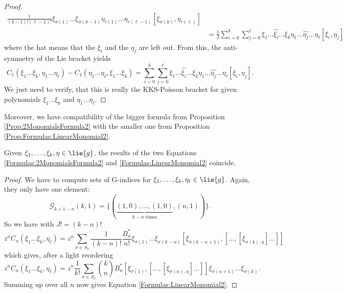 \begin{proof}
\begin{align*}
		\frac{1}{(k-1)! (\ell-1)!}
		\xi_{\sigma(1)} \ldots \xi_{\sigma(k-1)}
		\eta_{\tau(1)} \ldots \eta_{\tau(\ell-1)}
		[\xi_{\sigma(k)}, \eta_{\tau(\ell)}]
		\\
		& =
		\frac{1}{2}
		\sum\limits_{i = 0}^k
		\sum\limits_{j = 0}^{\ell}
		\xi_1 \ldots \widehat{\xi_i} \ldots \xi_k
		\eta_1 \ldots \widehat{\eta_j} \ldots \eta_{\ell}
		[\xi_i, \eta_j]
	\end{align*}
	where the hat means that the $\xi_i$ and the $\eta_j$ are left out. From 
	this, the anti-symmetry of the Lie bracket yields
	\begin{equation*}
		C_1 
		\left(
			\xi_1 \ldots \xi_k, \eta_1 \ldots \eta_{\ell}
		\right)
		-
		C_1 
		\left(
			\eta_1 \ldots \eta_{\ell}, \xi_1 \ldots \xi_k
		\right)
		=
		\sum\limits_{i = 0}^k
		\sum\limits_{j = 0}^{\ell}
		\xi_1 \ldots \widehat{\xi_i} \ldots \xi_k
		\eta_1 \ldots \widehat{\eta_j} \ldots \eta_{\ell}
		[\xi_i, \eta_j].
	\end{equation*}
	We just need to verify, that this is really the KKS-Poisson bracket for 
	given polynomials $\xi_1 \ldots \xi_k$ and $\eta_1 \ldots \eta_{\ell}$.
\end{proof}
Moreover, we have compatibility of the bigger formula from Proposition 
\ref{Prop:2MonomialsFormula2} with the smaller one from Proposition 
\ref{Prop:Formulas:LinearMonomial2}.
\begin{corollary}
	\label{Cor:Formulas:FormulasCoincide}
	Given $\xi_1, \ldots, \xi_k, \eta \in \lie{g}$, the results of the two 
	Equations \eqref{Formulas:2MonomialsFormula2} and 
	\eqref{Formulas:LinearMonomial2} coincide.
\end{corollary}
\begin{proof}
	We have to compute sets of G-indices for $\xi_1, \ldots, \xi_k, 
	\eta_{\ell} \in \lie{g}$. Again, they only have one element:
	\begin{equation*}
		\mathcal{G}_{k + 1 - n}(k, 1)
		=
		\Big\{
			( 
				\underbrace{(1,0), \ldots, (1,0)}_{
				k - n \text{ times}
				}
				,
				(n,1)
			)
		\Big\}.
	\end{equation*}
	So we have with $J! = (k - n)!$
	\begin{equation*}
		z^n C_n
		\left(
			\xi_1 \ldots \xi_k, \eta_{\ell}
		\right)
		=
		z^n
		\sum\limits_{\sigma \in S_k}
		\frac{1}{(k - n)!}
		\frac{B_n^*}{n!}
		\xi_{\sigma(1)} \ldots \xi_{\sigma(k-n)}
		[\xi_{\sigma(k-n+1)}, [
			\ldots, [\xi_{\sigma(k), \eta} ] \ldots 
		]]
	\end{equation*}
	which gives, after a light reordering
	\begin{equation*}
		z^n C_n
		\left(
			\xi_1 \ldots \xi_k, \eta_{\ell}
		\right)
		=
		z^n
		\frac{1}{k!}
		\sum\limits_{\sigma \in S_k}
		\binom{k}{n} B_n^*
		[\xi_{\sigma(1)}, [
			\ldots, [\xi_{\sigma(n), \eta} ] \ldots 
		]]
		\xi_{\sigma(n+1)} \ldots \xi_{\sigma(k)}.
	\end{equation*}
	Summing up over all $n$ now gives Equation 
	\eqref{Formulas:LinearMonomial2}.
\end{proof}
